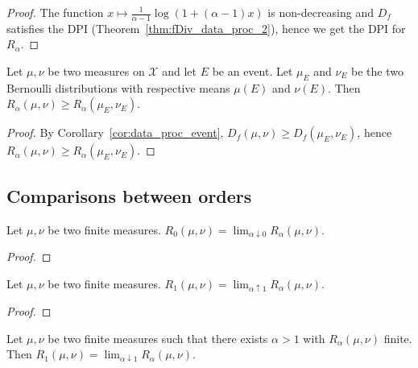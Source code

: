\begin{proof} \leanok
{}
The function $x \mapsto \frac{1}{\alpha - 1}\log (1 + (\alpha - 1)x)$ is non-decreasing and $D_f$ satisfies the DPI (Theorem~\ref{thm:fDiv_data_proc_2}), hence we get the DPI for $R_\alpha$.
\end{proof}


\begin{lemma}
  \label{lem:renyi_data_proc_event}
  Let $\mu, \nu$ be two measures on $\mathcal X$ and let $E$ be an event. Let $\mu_E$ and $\nu_E$ be the two Bernoulli distributions with respective means $\mu(E)$ and $\nu(E)$.
  Then $R_\alpha(\mu, \nu) \ge R_\alpha(\mu_E, \nu_E)$.
\end{lemma}

\begin{proof}
By Corollary~\ref{cor:data_proc_event}, $D_f(\mu, \nu) \ge D_f(\mu_E, \nu_E)$, hence $R_\alpha(\mu, \nu) \ge R_\alpha(\mu_E, \nu_E)$.
\end{proof}




\subsection{Comparisons between orders}

\begin{lemma}
  \label{lem:renyi_tendsto_renyi_zero}
  Let $\mu, \nu$ be two finite measures. $R_0(\mu, \nu) = \lim_{\alpha \downarrow 0} R_\alpha(\mu, \nu)$.
\end{lemma}

\begin{proof}
\end{proof}

\begin{lemma}
  \label{lem:renyi_tendsto_renyi_one}
  Let $\mu, \nu$ be two finite measures. $R_1(\mu, \nu) = \lim_{\alpha \uparrow 1} R_\alpha(\mu, \nu)$.
\end{lemma}

\begin{proof}
\end{proof}

\begin{lemma}
  \label{lem:renyi_tendsto_renyi_one_above}
  Let $\mu, \nu$ be two finite measures such that there exists $\alpha > 1$ with $R_\alpha(\mu, \nu)$ finite. Then $R_1(\mu, \nu) = \lim_{\alpha \downarrow 1} R_\alpha(\mu, \nu)$.
\end{lemma}

